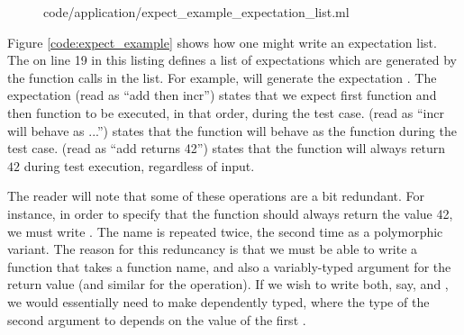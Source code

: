 \begin{figure}
 {code/application/expect_example_expectation_list.ml}
\end{figure}

Figure \ref{code:expect_example} shows how one might write an
expectation list. The  on line 19 in this listing defines
a list of expectations which are generated by the function calls in
the list. For example,  will generate the expectation
. The expectation  (read as ``add
then incr'') states that we expect first function  and then
function  to be executed, in that order, during the test
case.   (read as ``incr will behave
as ...'')  states that the  function will behave as the
function  during the test case.
 (read as ``add returns 42'') states that the
 function will always return $42$ during test execution,
regardless of input.

The reader will note that some of these operations are a bit
redundant. For instance, in order to specify that the 
function should always return the value 42, we must write
. The name  is repeated twice, the
second time as a polymorphic variant. The reason for this reduncancy
is that we must be able to write a  function that takes
a function name, and also a variably-typed argument for the return
value (and similar for the  operation). If we wish to write
both, say,  and , we would
essentially need to make \code{*->} dependently typed, where the type
of the second argument to \code{*->} depends on the value of the first
\cite[Chapter 2]{pierce:atapl}.

